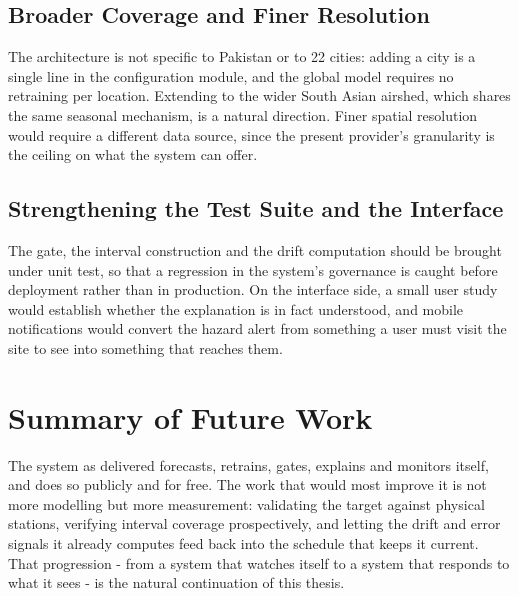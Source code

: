\subsection{Broader Coverage and Finer Resolution}
The architecture is not specific to Pakistan or to 22 cities: adding a city is a
single line in the configuration module, and the global model requires no
retraining per location. Extending to the wider South Asian airshed, which shares
the same seasonal mechanism, is a natural direction. Finer spatial resolution
would require a different data source, since the present provider's granularity is
the ceiling on what the system can offer.

\subsection{Strengthening the Test Suite and the Interface}
The gate, the interval construction and the drift computation should be brought
under unit test, so that a regression in the system's governance is caught before
deployment rather than in production. On the interface side, a small user study
would establish whether the explanation is in fact understood, and mobile
notifications would convert the hazard alert from something a user must visit the
site to see into something that reaches them.

\section{Summary of Future Work}
The system as delivered forecasts, retrains, gates, explains and monitors itself,
and does so publicly and for free. The work that would most improve it is not more
modelling but more measurement: validating the target against physical stations,
verifying interval coverage prospectively, and letting the drift and error signals
it already computes feed back into the schedule that keeps it current. That
progression - from a system that watches itself to a system that responds to what
it sees - is the natural continuation of this thesis.
